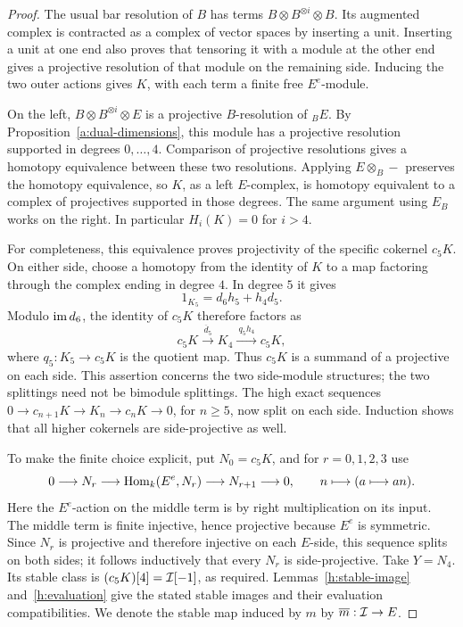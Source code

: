 \begin{proof}
The usual bar resolution of \(B\) has terms
\(B\otimes B^{\otimes i}\otimes B\).  Its augmented complex is contracted
as a complex of vector spaces by inserting a unit.  Inserting a unit at
one end also proves that tensoring it with a module at the other end
gives a projective resolution of that module on the remaining side.
Inducing the two outer actions gives \(K\), with each term a finite free
\(E^e\)-module.

On the left, \(B\otimes B^{\otimes i}\otimes E\) is a projective
\(B\)-resolution of \({}_BE\).  By Proposition~\ref{a:dual-dimensions}, this
module has a projective resolution supported in degrees \(0,\ldots,4\).
Comparison of projective resolutions gives a homotopy equivalence
between these two resolutions.  Applying \(E\otimes_B-\) preserves the
homotopy equivalence, so \(K\), as a left \(E\)-complex, is homotopy
equivalent to a complex of projectives supported in those degrees.
The same argument using \(E_B\) works on the right.  In particular
\(H_i(K)=0\) for \(i>4\).

For completeness, this equivalence proves projectivity of the specific
cokernel \(c_5K\).  On either side, choose a homotopy from the identity
of \(K\) to a map factoring through the complex ending in degree \(4\).
In degree \(5\) it gives
\[
 1_{K_5}=d_6h_5+h_4d_5.
\]
Modulo \(\operatorname{im} d_6\), the identity of \(c_5K\) therefore factors as
\[
 c_5K\xrightarrow{\ \overline d_5\ }K_4
       \xrightarrow{\ q_5h_4\ }c_5K,
\]
where \(q_5:K_5\to c_5K\) is the quotient map.  Thus \(c_5K\) is a
summand of a projective on each side.  This assertion concerns the two
side-module structures; the two splittings need not be bimodule
splittings.  The high exact sequences
\(0\to c_{n+1}K\to K_n\to c_nK\to0\), for \(n\geq5\), now split
on each side.  Induction shows that all higher cokernels are
side-projective as well.

To make the finite choice explicit, put \(N_0=c_5K\), and for
\(r=0,1,2,3\) use
\[
 0\longrightarrow N_r\longrightarrow
 \operatorname{Hom}_k(E^e,N_r)\longrightarrow N_{r+1}\longrightarrow0,\qquad
 n\longmapsto(a\longmapsto an).
\]
Here the \(E^e\)-action on the middle term is by right multiplication
on its input.  The middle term is finite injective, hence projective
because \(E^e\) is symmetric.  Since \(N_r\) is projective and therefore
injective on each \(E\)-side, this sequence splits on both sides; it
follows inductively that every \(N_r\) is side-projective.
Take \(Y=N_4\).  Its stable class is
\((c_5K)[4]=\mathcal I[-1]\), as required.  Lemmas~\ref{h:stable-image}
and~\ref{h:evaluation} give the stated stable images and their
evaluation compatibilities.  We denote the stable map induced by
\(m\) by \(\overline m:\mathcal I\to E\).
\end{proof}

